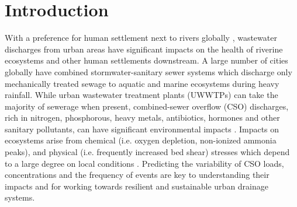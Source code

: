 \documentclass{agujournal2018}
\begin{document}
%


\begin{abstract}
Water and pollutant f\/luxes from combined sewer overf\/lows (CSO) have a signif\/icant impact on receiving waters. The random nature of rainfall forcing dominates the variability of sewer discharges, pollutant loads, and concentrations. An analytical model developed here, shows how sewer network topology and rainfall properties variously impact the stochasticity of CSO functioning. Probability distributions of sewer discharge and concentration compare well with the results from a calibrated Storm Water Management Model in an application to a sewershed located in Dresden, Germany. The model is determined by only four parameters, three of which can be predicted a priori, two from the rainfall record and one from the network topology using geomorphological f\/low recession theory, while the fourth can be estimated from a short discharge time series.  The sensitivity of CSO and wastewater treatment loads to network structure suggests simple topologies may be more vulnerable to poor performance. The analytical model is useful for evaluating various CSO management strategies to reduce adverse impacts on receiving waters in a probabilistic setting.
\end{abstract}

%
%

\section{Introduction}
With a preference for human settlement next to rivers globally \citep{Fang_2018}, wastewater discharges from urban areas have signif\/icant impacts on the health of riverine ecosystems and other human settlements downstream. A large number of cities globally have combined stormwater-sanitary sewer systems which discharge only mechanically treated sewage to aquatic and marine ecosystems during heavy rainfall. While urban wastewater treatment plants (UWWTPs) can take the majority of sewerage when present, combined-sewer overf\/low (CSO) discharges, rich in nitrogen, phosphorous, heavy metals, antibiotics, hormones and other sanitary pollutants, can have signif\/icant environmental impacts  \citep{David_2013,Phillips_2012}. Impacts on ecosystems arise from chemical (i.e. oxygen depletion, non-ionized ammonia peaks), and physical  (i.e. frequently increased bed shear) stresses which  depend to a large degree on local conditions \citep{borchardt1997urban}. Predicting the variability of CSO loads, concentrations and the frequency of events are key to understanding their impacts and for working towards resilient and sustainable urban drainage systems.
\end{document}
